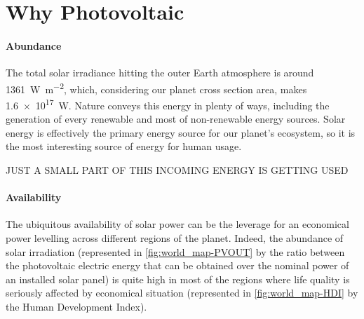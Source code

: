 
\section{Why Photovoltaic}

	\paragraph{Abundance}
	The total solar irradiance hitting the outer Earth atmosphere is around \SI{1361}{\watt\per\square\metre},\cite{Kopp2011} which, considering our planet cross section area, makes \SI{1.6e17}{\watt}.
	Nature conveys this energy in plenty of ways, including the generation of every renewable and most of non-renewable energy sources.
	Solar energy is effectively the primary energy source for our planet's ecosystem, so it is the most interesting source of energy for human usage.

JUST A SMALL PART OF THIS INCOMING ENERGY IS GETTING USED


	\paragraph{Availability}
	The ubiquitous availability of solar power can be the leverage for an economical power levelling across different regions of the planet.
	Indeed, the abundance of solar irradiation (represented in \cref{fig:world_map-PVOUT} by the ratio between the photovoltaic electric energy that can be obtained over the nominal power of an installed solar panel) is quite high in most of the regions where life quality is seriously affected by economical situation (represented in \cref{fig:world_map-HDI} by the Human Development Index).

